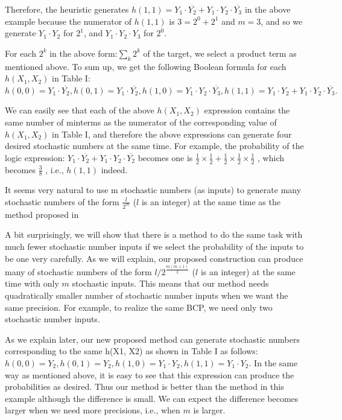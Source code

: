 \documentclass[10pt,conference]{IEEEtran}
\begin{document}
\par
Therefore, the heuristic generates $h(1, 1) = Y_1 \cdot \overline{Y_2} + Y_1 \cdot
Y_2 \cdot \overline{Y_3}$ in the above example because the numerator of $h(1, 1)$
is $3 =2^0 + 2^1$ and $m = 3$, and so we generate $Y_1 \cdot Y_2$ for $2^1$,
and $Y_1 \cdot Y_2 \cdot Y_3$ for $2^0$. 

\par
For each $2^k$ in the above form:$\sum_{k} 2^{k}$ of the target, we
select a product term as mentioned above. To sum up, we get
the following Boolean formula for each $h(X_1, X_2)$ in Table I:
$h(0, 0) = Y_1 \cdot \overline{Y_2}, h(0, 1) = Y_1 \cdot \overline{Y_2}, h(1, 0) = Y_1 \cdot Y_2 \cdot \overline{Y_3}, h(1, 1) = Y_1 \cdot Y_2 + Y_1 \cdot Y_2 \cdot \overline{Y_3}.$

\par
We can easily see that each of the above $h(X_1, X_2)$ expression
contains the same number of minterms as the numerator
of the corresponding value of $h(X_1, X_2)$ in Table I, and therefore
the above expressions can generate four desired stochastic
numbers at the same time. For example, the probability of the
logic expression: $Y_1 \cdot \overline{Y_2} + Y_1 \cdot Y_2 \cdot \overline{Y_2}$ becomes one is 
$\frac{1}{2} \times \frac{1}{2} + \frac{1}{2} \times \frac{1}{2} \times \frac{1}{2}$
, which becomes $\frac{3}{8}$ , i.e., $h(1, 1)$ indeed.

\par
It seems very natural to use m stochastic numbers (as
inputs) to generate many stochastic numbers of the form $\frac{l}{2^m}$ ($l$
is an integer) at the same time as the method proposed in  \cite{b15}

\par
A bit surprisingly, we will show that there is a method to do
the same task with much fewer stochastic number inputs if we
select the probability of the inputs to be one very carefully. As
we will explain, our proposed construction can produce many
of stochastic numbers of the form $l/2^{\frac{m(m+1)}{2}}$ ($l$ is an integer) at
the same time with only $m$ stochastic inputs. This means that our method needs quadratically smaller number of stochastic number inputs when we want the same precision. For example,
to realize the same BCP, we need only two stochastic number inputs.

\par
As we explain later, our new proposed method can generate
stochastic numbers corresponding to the same h(X1, X2) as
shown in Table I as follows: $h(0, 0) = Y_2, h(0, 1) = Y_2,
h(1, 0) = Y_1 \cdot Y_2, h(1, 1) = Y_1 \cdot Y_2$. In the same way as
mentioned above, it is easy to see that this expression can
produce the probabilities as desired. Thus our method is better
than the method \cite{fifteen} in this example although the difference
is small. We can expect the difference becomes larger when
we need more precisions, i.e., when $m$ is larger.
\end{document}
